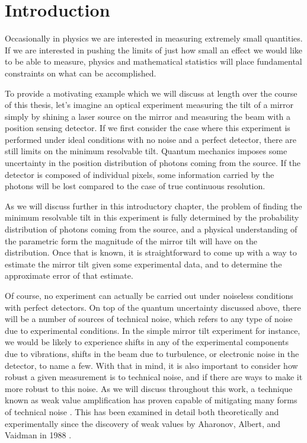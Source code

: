 \chapter{Introduction}
Occasionally in physics we are interested in measuring extremely small quantities.  If we are interested in pushing the limits of just how small an effect we would like to be able to measure, physics and mathematical statistics will place fundamental constraints on what can be accomplished.

To provide a motivating example which we will discuss at length over the course of this thesis, let's imagine an optical experiment measuring the tilt of a mirror simply by shining a laser source on the mirror and measuring the beam with a position sensing detector.  If we first consider the case where this experiment is performed under ideal conditions with no noise and a perfect detector, there are still limits on the minimum resolvable tilt.  Quantum mechanics imposes some uncertainty in the position distribution of photons coming from the source.  If the detector is composed of individual pixels, some information carried by the photons will be lost compared to the case of true continuous resolution.

As we will discuss further in this introductory chapter, the problem of finding the minimum resolvable tilt in this experiment is fully determined by the probability distribution of photons coming from the source, and a physical understanding of the parametric form the magnitude of the mirror tilt will have on the distribution.  Once that is known, it is straightforward to come up with a way to estimate the mirror tilt given some experimental data, and to determine the approximate error of that estimate.

Of course, no experiment can actually be carried out under noiseless conditions with perfect detectors.  On top of the quantum uncertainty discussed above, there will be a number of sources of technical noise, which refers to any type of noise due to experimental conditions.  In the simple mirror tilt experiment for instance, we would be likely to experience shifts in any of the experimental components due to vibrations, shifts in the beam due to turbulence, or electronic noise in the detector, to name a few.  With that in mind, it is also important to consider how robust a given measurement is to technical noise, and if there are ways to make it more robust to this noise.  As we will discuss throughout this work, a technique known as weak value amplification has proven capable of mitigating many forms of technical noise \cite{Jordan2014, Starling2009}.  This has been examined in detail both theoretically and experimentally since the discovery of weak values by Aharonov, Albert, and Vaidman in 1988 \cite{Aharonov1988}.

